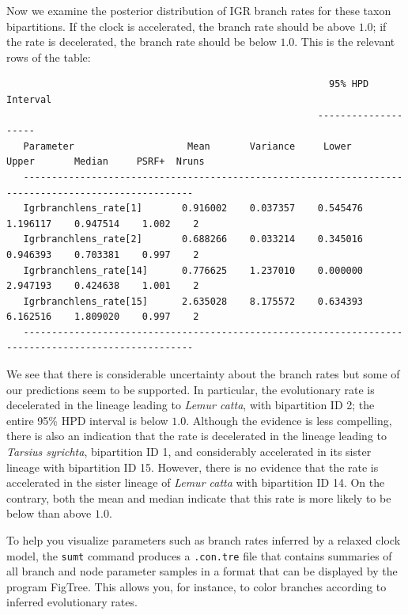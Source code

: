 \documentclass[12pt]{book}
\newcommand{\ttt}[1]{\texttt{#1}}
\begin{document}
Now we examine the posterior distribution of IGR branch rates for these taxon bipartitions. If the
clock is accelerated, the branch rate should be above $1.0$; if the rate is decelerated, the branch
rate should be below $1.0$. This is the relevant rows of the table:

\scriptsize
\begin{singlespacing}
\begin{verbatim}
                                                         95% HPD Interval
                                                       --------------------
   Parameter                    Mean       Variance     Lower       Upper       Median     PSRF+  Nruns
   ----------------------------------------------------------------------------------------------------
   Igrbranchlens_rate[1]       0.916002    0.037357    0.545476    1.196117    0.947514    1.002    2
   Igrbranchlens_rate[2]       0.688266    0.033214    0.345016    0.946393    0.703381    0.997    2
   Igrbranchlens_rate[14]      0.776625    1.237010    0.000000    2.947193    0.424638    1.001    2
   Igrbranchlens_rate[15]      2.635028    8.175572    0.634393    6.162516    1.809020    0.997    2
   ----------------------------------------------------------------------------------------------------
\end{verbatim}
\end{singlespacing}
\normalsize

We see that there is considerable uncertainty about the branch rates but some of our predictions
seem to be supported. In particular, the evolutionary rate is decelerated in the lineage leading to
\textit{Lemur catta}, with bipartition ID 2; the entire 95\% HPD interval is below $1.0$. Although
the evidence is less compelling, there is also an indication that the rate is decelerated in the
lineage leading to \textit{Tarsius syrichta}, bipartition ID 1, and considerably accelerated in its
sister lineage with bipartition ID 15. However, there is no evidence that the rate is accelerated
in the sister lineage of \textit{Lemur catta} with bipartition ID 14. On the contrary, both the
mean and median indicate that this rate is more likely to be below than above $1.0$.

To help you visualize parameters such as branch rates inferred by a relaxed clock model, the
\ttt{sumt} command produces a \ttt{.con.tre} file that contains summaries of all branch and node
parameter samples in a format that can be displayed by the program FigTree. This allows you, for
instance, to color branches according to inferred evolutionary rates.
\end{document}
